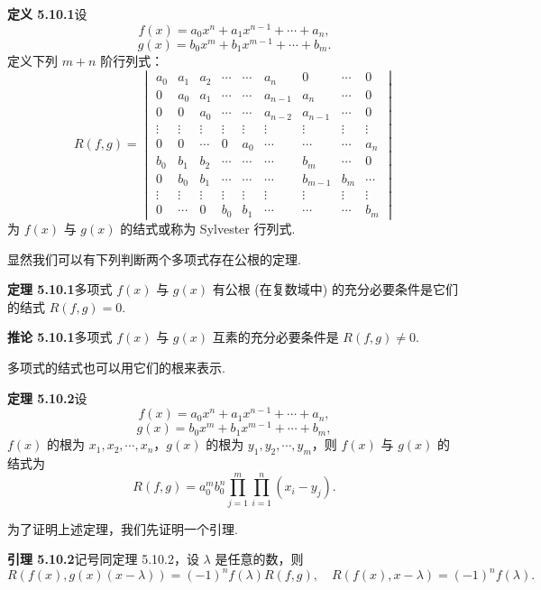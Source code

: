 \documentclass[UTF8, 12pt, fontset=fandol, oneside]{ctexart}
\begin{document}
\noindent\textbf{定义 5.10.1}\quad 设
\[
f(x)=a_0x^n+a_1x^{n-1}+\cdots+a_n,
\]
\[
g(x)=b_0x^m+b_1x^{m-1}+\cdots+b_m.
\]
定义下列 $m+n$ 阶行列式：
\[
R(f,g)=
\begin{vmatrix}
a_0&a_1&a_2&\cdots&\cdots&a_n&0&\cdots&0\\
0&a_0&a_1&\cdots&\cdots&a_{n-1}&a_n&\cdots&0\\
0&0&a_0&\cdots&\cdots&a_{n-2}&a_{n-1}&\cdots&0\\
\vdots&\vdots&\vdots&\vdots&\vdots&\vdots&\vdots&\vdots&\vdots\\
0&0&\cdots&0&a_0&\cdots&\cdots&\cdots&a_n\\
b_0&b_1&b_2&\cdots&\cdots&\cdots&b_m&\cdots&0\\
0&b_0&b_1&\cdots&\cdots&\cdots&b_{m-1}&b_m&\cdots\\
\vdots&\vdots&\vdots&\vdots&\vdots&\vdots&\vdots&\vdots&\vdots\\
0&\cdots&0&b_0&b_1&\cdots&\cdots&\cdots&b_m
\end{vmatrix}
\]
为 $f(x)$ 与 $g(x)$ 的结式或称为 Sylvester 行列式.

显然我们可以有下列判断两个多项式存在公根的定理.

\noindent\textbf{定理 5.10.1}\quad 多项式 $f(x)$ 与 $g(x)$ 有公根 (在复数域中) 的充分必要条件是它们的结式 $R(f,g)=0$.

\noindent\textbf{推论 5.10.1}\quad 多项式 $f(x)$ 与 $g(x)$ 互素的充分必要条件是 $R(f,g)\neq 0$.

多项式的结式也可以用它们的根来表示.

\noindent\textbf{定理 5.10.2}\quad 设
\[
f(x)=a_0x^n+a_1x^{n-1}+\cdots+a_n,
\]
\[
g(x)=b_0x^m+b_1x^{m-1}+\cdots+b_m,
\]
$f(x)$ 的根为 $x_1,x_2,\cdots,x_n$，$g(x)$ 的根为 $y_1,y_2,\cdots,y_m$，则 $f(x)$ 与 $g(x)$ 的结式为
\begin{equation}
R(f,g)=a_0^mb_0^n\prod_{j=1}^m\prod_{i=1}^n(x_i-y_j).
\tag{5.10.2}
\end{equation}

为了证明上述定理，我们先证明一个引理.

\noindent\textbf{引理 5.10.2}\quad 记号同定理 5.10.2，设 $\lambda$ 是任意的数，则
\[
R(f(x),g(x)(x-\lambda))=(-1)^nf(\lambda)R(f,g),\quad R(f(x),x-\lambda)=(-1)^nf(\lambda).
\]
\end{document}
